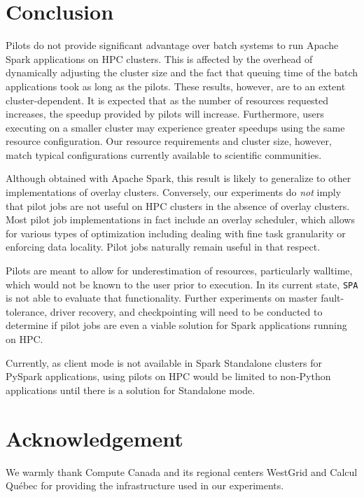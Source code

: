 \documentclass{IEEEtran}
\begin{document}
\section{Conclusion}\label{sec:conclusion}
Pilots do not provide significant advantage over batch systems to run
Apache Spark applications on HPC clusters. This is affected by the overhead of dynamically
adjusting the cluster size and the fact that queuing time of the batch
applications took as long as the pilots. These results, however, are to an
extent cluster-dependent. It is expected that as the number of resources
requested increases, the speedup provided by pilots will increase.
Furthermore, users executing on a smaller cluster may experience greater
speedups using the same resource configuration. Our resource requirements
and cluster size, however, match typical configurations currently available
to scientific communities.

Although obtained with Apache Spark, this result is likely to generalize to
other implementations of overlay clusters. Conversely, our experiments do
\emph{not} imply that pilot jobs are not useful on HPC clusters in the
absence of overlay clusters. Most pilot job implementations in fact include
an overlay scheduler, which allows for various types of optimization
including dealing with fine task granularity or enforcing data locality.
Pilot jobs naturally remain useful in that respect.

Pilots are meant to allow for underestimation of resources, particularly
walltime, which would not be known to the user prior to execution. In its
current state, \texttt{SPA} is not able to evaluate that functionality.
Further experiments on master fault-tolerance, driver recovery, and
checkpointing will need to be conducted to determine if pilot jobs are even
a viable solution for Spark applications running on HPC.

Currently, as client mode is not available in Spark Standalone clusters for
PySpark applications, using pilots on HPC would be limited to non-Python
applications until there is a solution for Standalone mode.

\section*{Acknowledgement}

We warmly thank Compute Canada and its regional centers WestGrid and Calcul
Qu\'ebec for providing the infrastructure used in our experiments.

 

\end{document}

